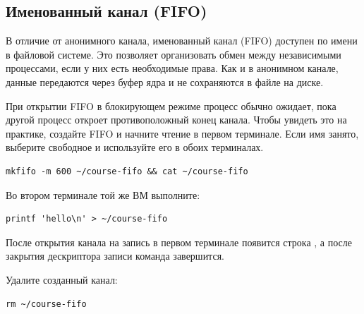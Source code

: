 \subsection{Именованный канал (FIFO)}

В отличие от анонимного канала, именованный канал (FIFO) доступен по имени в файловой системе. Это позволяет организовать обмен между независимыми процессами, если у них есть необходимые права. Как и в анонимном канале, данные передаются через буфер ядра и не сохраняются в файле на диске.

При открытии FIFO в блокирующем режиме процесс обычно ожидает, пока другой процесс откроет противоположный конец канала. Чтобы увидеть это на практике, создайте FIFO и начните чтение в первом терминале. Если имя занято, выберите свободное и используйте его в обоих терминалах.
\par\addvspace{10pt}\noindent\begin{minipage}{\linewidth}
\begin{verbatim}
mkfifo -m 600 ~/course-fifo && cat ~/course-fifo
\end{verbatim}
\end{minipage}\par\addvspace{10pt}
\par\addvspace{10pt}\noindent\begin{minipage}{\linewidth}
\setlength{\parindent}{0pt}\noindent\hspace*{1.25cm}Во втором терминале той же ВМ выполните:\par\kern 10pt
\begin{verbatim}
printf 'hello\n' > ~/course-fifo
\end{verbatim}
\end{minipage}\par\addvspace{10pt}
После открытия канала на запись в первом терминале появится строка , а после закрытия дескриптора записи команда  завершится.

\par\addvspace{10pt}\noindent\begin{minipage}{\linewidth}
\setlength{\parindent}{0pt}\noindent\hspace*{1.25cm}Удалите созданный канал:\par\kern 10pt
\begin{verbatim}
rm ~/course-fifo
\end{verbatim}
\end{minipage}\par\addvspace{10pt}


